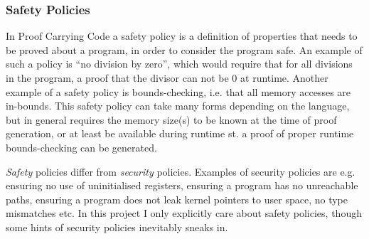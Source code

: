 




\subsubsection{Safety Policies}
\label{subsec:safety_policies}

In Proof Carrying Code a safety policy is a definition of properties that needs to be proved about a program, in order to consider the program safe. An example of such a policy is ``no division by zero'', which would require that for all divisions in the program, a proof that the divisor can not be 0 at runtime. Another example of a safety policy is bounds-checking, i.e. that all memory accesses are in-bounds. This safety policy can take many forms depending on the language, but in general requires the memory size(s) to be known at the time of proof generation, or at least be available during runtime st. a proof of proper runtime bounds-checking can be generated. 


\textit{Safety} policies differ from \textit{security} policies. Examples of security policies are e.g. ensuring no use of uninitialised registers, ensuring a program has no unreachable paths, ensuring a program does not leak kernel pointers to user space, no type mismatches etc. In this project I only explicitly care about safety policies, though some hints of security policies inevitably sneaks in. 




